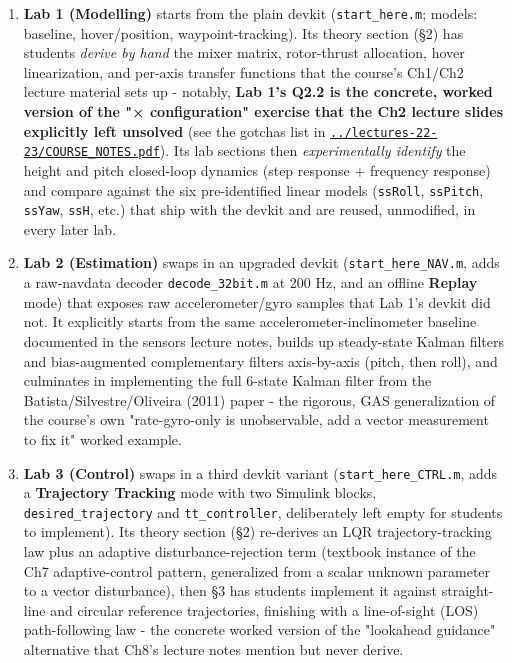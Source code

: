 \documentclass[11pt]{article}
\begin{document}
\begin{enumerate}
\item \textbf{Lab 1 (Modelling)} starts from the plain devkit (\texttt{start\_\allowbreak{}here.m}; models: baseline, hover/position, waypoint-tracking). Its theory section (§2) has students \textit{derive by hand} the mixer matrix, rotor-thrust allocation, hover linearization, and per-axis transfer functions that the course's Ch1/Ch2 lecture material sets up - notably, \textbf{Lab 1's Q2.2 is the concrete, worked version of the "× configuration" exercise that the Ch2 lecture slides explicitly left unsolved} (see the gotchas list in \href{../lectures-22-23/COURSE_NOTES.pdf}{\texttt{../lectures-22-23/COURSE\_\allowbreak{}NOTES.pdf}}). Its lab sections then \textit{experimentally identify} the height and pitch closed-loop dynamics (step response + frequency response) and compare against the six pre-identified linear models (\texttt{ssRoll}, \texttt{ssPitch}, \texttt{ssYaw}, \texttt{ssH}, etc.) that ship with the devkit and are reused, unmodified, in every later lab.
\item \textbf{Lab 2 (Estimation)} swaps in an upgraded devkit (\texttt{start\_\allowbreak{}here\_\allowbreak{}NAV.m}, adds a raw-navdata decoder \texttt{decode\_\allowbreak{}32bit.m} at 200 Hz, and an offline \textbf{Replay} mode) that exposes raw accelerometer/gyro samples that Lab 1's devkit did not. It explicitly starts from the same accelerometer-inclinometer baseline documented in the sensors lecture notes, builds up steady-state Kalman filters and bias-augmented complementary filters axis-by-axis (pitch, then roll), and culminates in implementing the full 6-state Kalman filter from the Batista/Silvestre/Oliveira (2011) paper - the rigorous, GAS generalization of the course's own "rate-gyro-only is unobservable, add a vector measurement to fix it" worked example.
\item \textbf{Lab 3 (Control)} swaps in a third devkit variant (\texttt{start\_\allowbreak{}here\_\allowbreak{}CTRL.m}, adds a \textbf{Trajectory Tracking} mode with two Simulink blocks, \texttt{desired\_\allowbreak{}trajectory} and \texttt{tt\_\allowbreak{}controller}, deliberately left empty for students to implement). Its theory section (§2) re-derives an LQR trajectory-tracking law plus an adaptive disturbance-rejection term (textbook instance of the Ch7 adaptive-control pattern, generalized from a scalar unknown parameter to a vector disturbance), then §3 has students implement it against straight-line and circular reference trajectories, finishing with a line-of-sight (LOS) path-following law - the concrete worked version of the "lookahead guidance" alternative that Ch8's lecture notes mention but never derive.
\end{enumerate}
\end{document}

